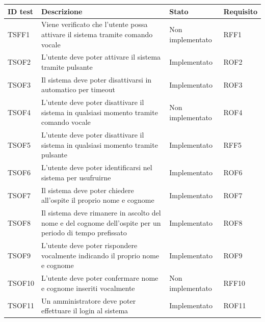 \documentclass[../PianoDiQualifica_v4.0.0.tex]{subfiles}
\begin{document}
	\begin{longtable}[c] { >{\centering\arraybackslash}p{2cm} p{7cm} >{\centering\arraybackslash}p{4cm} >{\centering\arraybackslash}p{2cm}}
		\toprule
		\centerline{\textbf{ID test}} & \centerline{\textbf{Descrizione}} & \centerline{\textbf{Stato}} & \centerline{\textbf{Requisito}}\\
			\midrule
			TSFF1 & Viene verificato che l'utente possa attivare il sistema tramite comando vocale & Non implementato & RFF1 \\
			\addlinespace[0.3em]
			\midrule
			\addlinespace[0.3em]
			TSOF2 & L'utente deve poter attivare il sistema tramite pulsante & Implementato & ROF2 \\
			\addlinespace[0.3em]
			\midrule
			\addlinespace[0.3em]
			TSOF3 & Il sistema deve poter disattivarsi in automatico per timeout & Implementato & ROF3 \\
			\addlinespace[0.3em]
			\midrule
			\addlinespace[0.3em]
			TSOF4 & L'utente deve poter disattivare il sistema in qualsiasi momento tramite comando vocale & Non implementato & ROF4 \\
			\addlinespace[0.3em]
			\midrule
			\addlinespace[0.3em]
			TSOF5 & L'utente deve poter disattivare il sistema in qualsiasi momento tramite pulsante & Implementato & RFF5 \\
			\addlinespace[0.3em]
			\midrule
			\addlinespace[0.3em]
			TSOF6 & L'utente deve poter identificarsi nel sistema per usufruirne & Implementato & ROF6 \\
			\addlinespace[0.3em]
			\midrule
			\addlinespace[0.3em]
			TSOF7 & Il sistema deve poter chiedere all'ospite il proprio nome e cognome & Implementato & ROF7 \\
			\addlinespace[0.3em]
			\midrule
			\addlinespace[0.3em]
			TSOF8 & Il sistema deve rimanere in ascolto del nome e del cognome dell'ospite per un periodo di tempo prefissato & Implementato & ROF8 \\
			\addlinespace[0.3em]
			\midrule
			\addlinespace[0.3em]
			TSOF9 & L'utente deve poter rispondere vocalmente indicando il proprio nome e cognome & Implementato & ROF9 \\
			\addlinespace[0.3em]
			\midrule
			\addlinespace[0.3em]
			TSOF10 & L'utente deve poter confermare nome e cognome inseriti vocalmente & Non implementato & RFF10 \\
			\addlinespace[0.3em]
			\midrule
			\addlinespace[0.3em]
			TSOF11 & Un amministratore deve poter effettuare il login al sistema & Implementato & ROF11 \\

\end{longtable}
\end{document}
